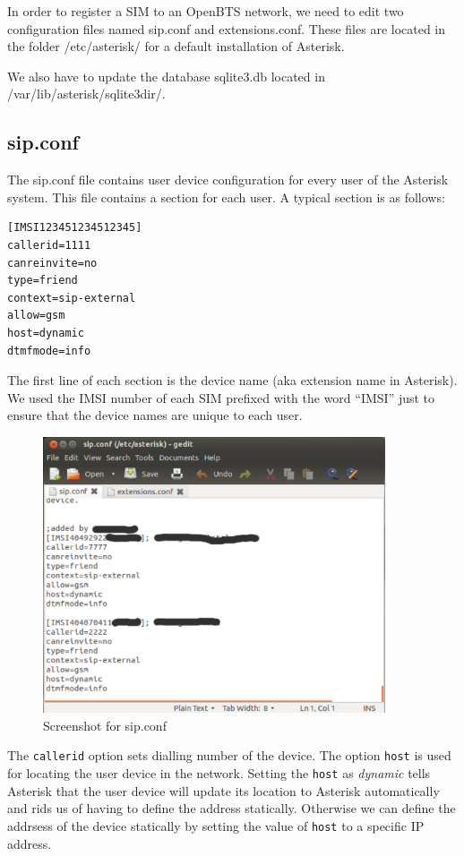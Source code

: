 In order to register a SIM to an OpenBTS network, we need to edit two 
configuration files named \textsf{sip.conf} and \textsf{extensions.conf}. These
files are located in the folder \textsf{/etc/asterisk/} for a default 
installation of Asterisk.

We also have to update the database \textsf{sqlite3.db} located in
\textsf{/var/lib/asterisk/sqlite3dir/}.

\subsection{sip.conf}

The \textsf{sip.conf} file contains user device configuration for every user of 
the Asterisk system. This file contains a section for each user. A typical 
section is as follows:
\begin{verbatim}
[IMSI123451234512345]
callerid=1111
canreinvite=no
type=friend
context=sip-external
allow=gsm
host=dynamic
dtmfmode=info    
\end{verbatim}

The first line of each section is the device name (aka extension name in
Asterisk). We used the IMSI number of each SIM prefixed with the word ``IMSI''
just to ensure that the device names are unique to each user.

\begin{figure}
  \centering
    \includegraphics[width=0.9\textwidth]{../images/sip_conf}
  \caption[Screenshot - sip.conf]{Screenshot for \textsf{sip.conf}}
  \label{sip_conf}
\end{figure}

The \texttt{callerid} option sets dialling number of the device. The option
\texttt{host} is used for locating the user device in the network. Setting the
\texttt{host} as \textsl{dynamic} tells Asterisk that the user device will
update its location to Asterisk automatically and rids us of having to define 
the address statically. Otherwise we can define the addrsess of the device 
statically by setting the value of \texttt{host} to a specific IP address.

